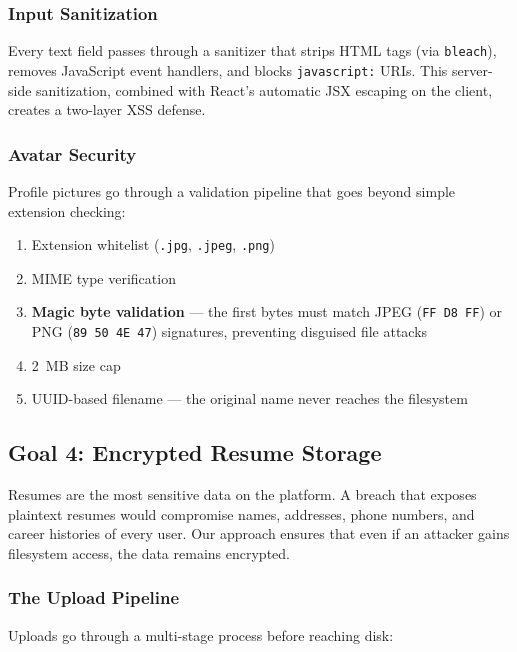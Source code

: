 \subsubsection{Input Sanitization}

Every text field passes through a sanitizer that strips HTML tags (via \texttt{bleach}), removes JavaScript event handlers, and blocks \texttt{javascript:} URIs. This server-side sanitization, combined with React's automatic JSX escaping on the client, creates a two-layer XSS defense.

\subsubsection{Avatar Security}

Profile pictures go through a validation pipeline that goes beyond simple extension checking:

\begin{enumerate}
    \item Extension whitelist (\texttt{.jpg}, \texttt{.jpeg}, \texttt{.png})
    \item MIME type verification
    \item \textbf{Magic byte validation} — the first bytes must match JPEG (\texttt{FF D8 FF}) or PNG (\texttt{89 50 4E 47}) signatures, preventing disguised file attacks
    \item 2~MB size cap
    \item UUID-based filename — the original name never reaches the filesystem
\end{enumerate}

\subsection{Goal 4: Encrypted Resume Storage}

Resumes are the most sensitive data on the platform. A breach that exposes plaintext resumes would compromise names, addresses, phone numbers, and career histories of every user. Our approach ensures that even if an attacker gains filesystem access, the data remains encrypted.

\subsubsection{The Upload Pipeline}

Uploads go through a multi-stage process before reaching disk:

